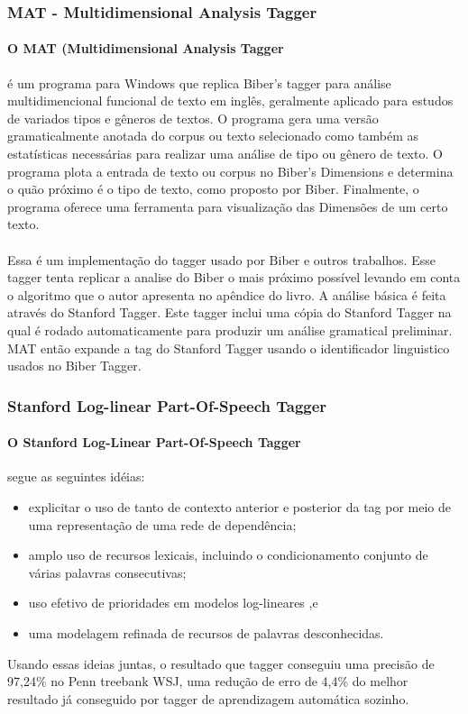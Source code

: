 \documentclass[a4paper, 10pt]{article}
\begin{document}
        	\subsubsection{MAT - Multidimensional Analysis Tagger}
            	\paragraph{O MAT (Multidimensional Analysis Tagger} é um programa para Windows que replica Biber's tagger para análise multidimencional funcional de texto em inglês, geralmente aplicado para estudos de variados tipos e gêneros de textos. O programa gera uma versão gramaticalmente anotada do corpus ou texto selecionado como também as estatísticas necessárias para realizar uma análise de tipo ou gênero de texto. O programa plota a entrada de texto ou corpus no Biber's Dimensions e determina o quão próximo é o tipo de texto, como proposto por Biber. Finalmente, o programa oferece uma ferramenta para visualização das Dimensões de um certo texto.
                \paragraph{}Essa é um implementação do tagger usado por Biber e outros trabalhos. Esse tagger tenta replicar a analise do Biber o mais próximo possível levando em conta o algoritmo que o autor apresenta no apêndice do livro. A análise básica é feita através do Stanford Tagger. Este tagger inclui uma cópia do Stanford Tagger na qual é rodado automaticamente para produzir um análise gramatical preliminar. MAT então expande a tag do Stanford Tagger usando o identificador linguistico usados no Biber Tagger. 
            \subsubsection{Stanford Log-linear Part-Of-Speech Tagger}
            	\paragraph{O Stanford Log-Linear Part-Of-Speech Tagger} segue as seguintes idéias:
                \begin{itemize}
                	\item explicitar o uso de tanto de contexto anterior e posterior da tag por meio de uma representação de uma rede de dependência;
                    \item amplo uso de recursos lexicais, incluindo o condicionamento conjunto de várias palavras consecutivas;
                    \item uso efetivo de prioridades em modelos log-lineares ,e
                    \item uma modelagem refinada de recursos de palavras desconhecidas.
                \end{itemize}
            	Usando essas ideias juntas, o resultado que tagger conseguiu uma precisão de 97,24\% no Penn treebank WSJ, uma redução de erro de 4,4\% do melhor resultado já conseguido por tagger de aprendizagem automática sozinho.
        	
\end{document}
